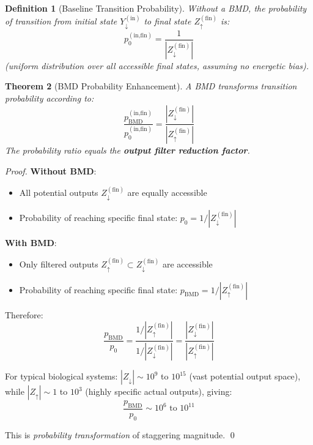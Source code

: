 \documentclass[11pt]{article}
\newtheorem{theorem}{Theorem}[section]
\newtheorem{definition}[theorem]{Definition}
\theoremstyle{remark}
\begin{document}
\begin{definition}[Baseline Transition Probability]
\label{def:baseline_prob}
Without a BMD, the probability of transition from initial state $Y_{\downarrow}^{(\text{in})}$ to final state $Z_{\uparrow}^{(\text{fin})}$ is:
\begin{equation}
p_0^{(\text{in,fin})} = \frac{1}{|Z_{\downarrow}^{(\text{fin})}|}
\end{equation}
(uniform distribution over all accessible final states, assuming no energetic bias).
\end{definition}

\begin{theorem}[BMD Probability Enhancement]
\label{thm:bmd_probability}
A BMD transforms transition probability according to:
\begin{equation}
\frac{p_{\text{BMD}}^{(\text{in,fin})}}{p_0^{(\text{in,fin})} } = \frac{|Z_{\downarrow}^{(\text{fin})}|}{|Z_{\uparrow}^{(\text{fin})}|}
\end{equation}
The probability ratio equals the \textbf{output filter reduction factor}.
\end{theorem}

\begin{proof}
\textbf{Without BMD}:
\begin{itemize}
\item All potential outputs $Z_{\downarrow}^{(\text{fin})}$ are equally accessible
\item Probability of reaching specific final state: $p_0 = 1/|Z_{\downarrow}^{(\text{fin})}|$
\end{itemize}

\textbf{With BMD}:
\begin{itemize}
\item Only filtered outputs $Z_{\uparrow}^{(\text{fin})} \subset Z_{\downarrow}^{(\text{fin})}$ are accessible
\item Probability of reaching specific final state: $p_{\text{BMD}} = 1/|Z_{\uparrow}^{(\text{fin})}|$
\end{itemize}

Therefore:
\begin{equation}
\frac{p_{\text{BMD}}}{p_0} = \frac{1/|Z_{\uparrow}^{(\text{fin})}|}{1/|Z_{\downarrow}^{(\text{fin})}|} = \frac{|Z_{\downarrow}^{(\text{fin})}|}{|Z_{\uparrow}^{(\text{fin})}|}
\end{equation}

For typical biological systems: $|Z_{\downarrow}| \sim 10^{9}$ to $10^{15}$ (vast potential output space), while $|Z_{\uparrow}| \sim 1$ to $10^3$ (highly specific actual outputs), giving:
\begin{equation}
\frac{p_{\text{BMD}}}{p_0} \sim 10^6 \text{ to } 10^{11}
\end{equation}

This is \textit{probability transformation} of staggering magnitude. \qed
\end{proof}
\end{document}
